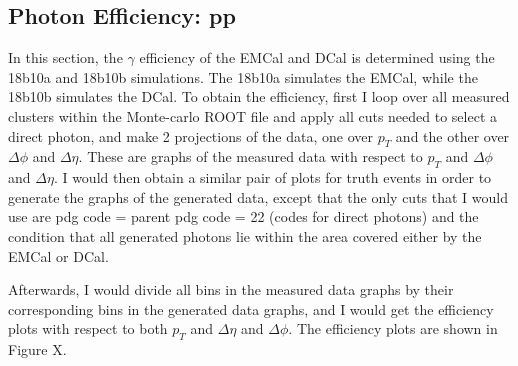 \begin{appendices}
\section{Photon Efficiency: pp}
In this section, the $\gamma$ efficiency of the EMCal and DCal is determined using the 18b10a and 18b10b simulations. The 18b10a simulates the EMCal, while the 18b10b simulates the DCal. To obtain the efficiency, first I loop over all measured clusters within the Monte-carlo ROOT file and apply all cuts needed to select a direct photon, and make 2 projections of the data, one over $p_T$ and the other over $\Delta \phi$ and $\Delta \eta$. These are graphs of the measured data with respect to $p_T$ and $\Delta \phi$ and $\Delta \eta$. I would then obtain a similar pair of plots for truth events in order to generate the graphs of the generated data, except that the only cuts that I would use are pdg code = parent pdg code = 22 (codes for direct photons) and the condition that all generated photons lie within the area covered either by the EMCal or DCal. 

Afterwards, I would divide all bins in the measured data graphs by their corresponding bins in the generated data graphs, and I would get the efficiency plots with respect to both $p_T$ and $\Delta \eta$ and $\Delta \phi$. The efficiency plots are shown in Figure X.
\end{appendices}